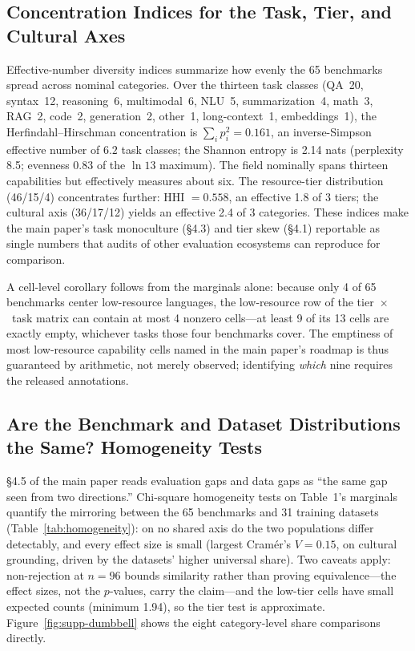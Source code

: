 \documentclass[letterpaper]{article}
\begin{document}
\subsection{Concentration Indices for the Task, Tier, and Cultural Axes}
\label{sec:diversity}
Effective-number diversity indices summarize how evenly the 65 benchmarks spread across nominal categories. Over the thirteen task classes (QA~20, syntax~12, reasoning~6, multimodal~6, NLU~5, summarization~4, math~3, RAG~2, code~2, generation~2, other~1, long-context~1, embeddings~1), the Herfindahl--Hirschman concentration is $\sum_i p_i^2 = 0.161$, an inverse-Simpson effective number of $6.2$ task classes; the Shannon entropy is 2.14 nats (perplexity 8.5; evenness 0.83 of the $\ln 13$ maximum). The field nominally spans thirteen capabilities but effectively measures about six. The resource-tier distribution (46/15/4) concentrates further: HHI $= 0.558$, an effective 1.8 of 3 tiers; the cultural axis (36/17/12) yields an effective 2.4 of 3 categories. These indices make the main paper's task monoculture (\S4.3) and tier skew (\S4.1) reportable as single numbers that audits of other evaluation ecosystems can reproduce for comparison.

A cell-level corollary follows from the marginals alone: because only 4 of 65 benchmarks center low-resource languages, the low-resource row of the tier~$\times$~task matrix can contain at most 4 nonzero cells---at least 9 of its 13 cells are exactly empty, whichever tasks those four benchmarks cover. The emptiness of most low-resource capability cells named in the main paper's roadmap is thus guaranteed by arithmetic, not merely observed; identifying \emph{which} nine requires the released annotations.

\subsection{Are the Benchmark and Dataset Distributions the Same? Homogeneity Tests}
\label{sec:homogeneity}
\S4.5 of the main paper reads evaluation gaps and data gaps as ``the same gap seen from two directions.'' Chi-square homogeneity tests on Table~1's marginals quantify the mirroring between the 65 benchmarks and 31 training datasets (Table~\ref{tab:homogeneity}): on no shared axis do the two populations differ detectably, and every effect size is small (largest Cram\'er's $V = 0.15$, on cultural grounding, driven by the datasets' higher universal share). Two caveats apply: non-rejection at $n = 96$ bounds similarity rather than proving equivalence---the effect sizes, not the $p$-values, carry the claim---and the low-tier cells have small expected counts (minimum 1.94), so the tier test is approximate. Figure~\ref{fig:supp-dumbbell} shows the eight category-level share comparisons directly.
\end{document}
